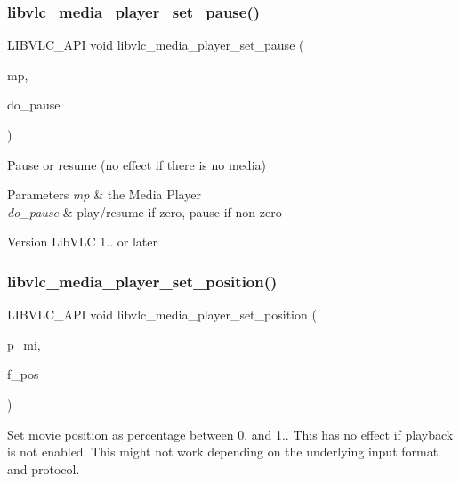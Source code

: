 \subsubsection{\texorpdfstring{libvlc\+\_\+media\+\_\+player\+\_\+set\+\_\+pause()}{libvlc\_media\_player\_set\_pause()}}
{\footnotesize\ttfamily L\+I\+B\+V\+L\+C\+\_\+\+A\+PI void libvlc\+\_\+media\+\_\+player\+\_\+set\+\_\+pause (\begin{DoxyParamCaption}\item[{libvlc\+\_\+media\+\_\+player\+\_\+t $\ast$}]{mp,  }\item[{int}]{do\+\_\+pause }\end{DoxyParamCaption})}

Pause or resume (no effect if there is no media)


\begin{DoxyParams}{Parameters}
{\em mp} & the Media Player \\
\hline
{\em do\+\_\+pause} & play/resume if zero, pause if non-\/zero \\
\hline
\end{DoxyParams}
\begin{DoxyVersion}{Version}
Lib\+V\+LC 1.. or later 
\end{DoxyVersion}
\mbox{\label{group__libvlc__media__player_ga4b672fe24ed2defbf732452d5ccbb4ac}} 
\subsubsection{\texorpdfstring{libvlc\+\_\+media\+\_\+player\+\_\+set\+\_\+position()}{libvlc\_media\_player\_set\_position()}}
{\footnotesize\ttfamily L\+I\+B\+V\+L\+C\+\_\+\+A\+PI void libvlc\+\_\+media\+\_\+player\+\_\+set\+\_\+position (\begin{DoxyParamCaption}\item[{libvlc\+\_\+media\+\_\+player\+\_\+t $\ast$}]{p\+\_\+mi,  }\item[{float}]{f\+\_\+pos }\end{DoxyParamCaption})}

Set movie position as percentage between 0. and 1.. This has no effect if playback is not enabled. This might not work depending on the underlying input format and protocol.


